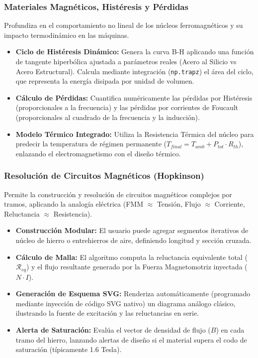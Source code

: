 \documentclass[11pt,a4paper]{article}
\begin{document}
\subsubsection{Materiales Magnéticos, Histéresis y Pérdidas}
Profundiza en el comportamiento no lineal de los núcleos ferromagnéticos y su impacto termodinámico en las máquinas.
\begin{itemize}
    \item \textbf{Ciclo de Histéresis Dinámico:} Genera la curva B-H aplicando una función de tangente hiperbólica ajustada a parámetros reales (Acero al Silicio vs Acero Estructural). Calcula mediante integración (\texttt{np.trapz}) el área del ciclo, que representa la energía disipada por unidad de volumen.
    \item \textbf{Cálculo de Pérdidas:} Cuantifica numéricamente las pérdidas por Histéresis (proporcionales a la frecuencia) y las pérdidas por corrientes de Foucault (proporcionales al cuadrado de la frecuencia y la inducción).
    \item \textbf{Modelo Térmico Integrado:} Utiliza la Resistencia Térmica del núcleo para predecir la temperatura de régimen permanente ($T_{final} = T_{amb} + P_{tot} \cdot R_{th}$), enlazando el electromagnetismo con el diseño térmico.
\end{itemize}

\subsubsection{Resolución de Circuitos Magnéticos (Hopkinson)}
Permite la construcción y resolución de circuitos magnéticos complejos por tramos, aplicando la analogía eléctrica (FMM $\approx$ Tensión, Flujo $\approx$ Corriente, Reluctancia $\approx$ Resistencia).
\begin{itemize}
    \item \textbf{Construcción Modular:} El usuario puede agregar segmentos iterativos de núcleo de hierro o entrehierros de aire, definiendo longitud y sección cruzada.
    \item \textbf{Cálculo de Malla:} El algoritmo computa la reluctancia equivalente total ($\mathcal{R}_{eq}$) y el flujo resultante generado por la Fuerza Magnetomotriz inyectada ($N \cdot I$).
    \item \textbf{Generación de Esquema SVG:} Renderiza automáticamente (programado mediante inyección de código SVG nativo) un diagrama análogo clásico, ilustrando la fuente de excitación y las reluctancias en serie.
    \item \textbf{Alerta de Saturación:} Evalúa el vector de densidad de flujo ($B$) en cada tramo del hierro, lanzando alertas de diseño si el material supera el codo de saturación (típicamente 1.6 Tesla).
\end{itemize}
\end{document}

